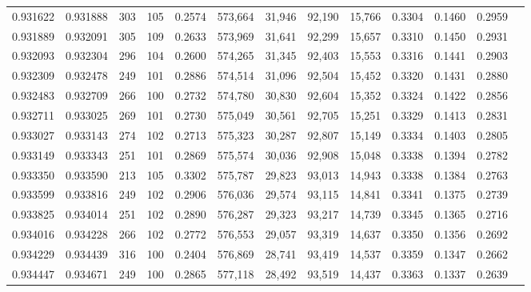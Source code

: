 \begin{tabular}{rrrrrrrrrrrrr}
0.931622 & 0.931888 &   303 & 105 &                                     0.2574 & 573,664 &  31,946 &  92,190 &  15,766 & 0.3304 & 0.1460 & 0.2959 \\
0.931889 & 0.932091 &   305 & 109 &                                     0.2633 & 573,969 &  31,641 &  92,299 &  15,657 & 0.3310 & 0.1450 & 0.2931 \\
0.932093 & 0.932304 &   296 & 104 &                                     0.2600 & 574,265 &  31,345 &  92,403 &  15,553 & 0.3316 & 0.1441 & 0.2903 \\
0.932309 & 0.932478 &   249 & 101 &                                     0.2886 & 574,514 &  31,096 &  92,504 &  15,452 & 0.3320 & 0.1431 & 0.2880 \\
0.932483 & 0.932709 &   266 & 100 &                                     0.2732 & 574,780 &  30,830 &  92,604 &  15,352 & 0.3324 & 0.1422 & 0.2856 \\
0.932711 & 0.933025 &   269 & 101 &                                     0.2730 & 575,049 &  30,561 &  92,705 &  15,251 & 0.3329 & 0.1413 & 0.2831 \\
0.933027 & 0.933143 &   274 & 102 &                                     0.2713 & 575,323 &  30,287 &  92,807 &  15,149 & 0.3334 & 0.1403 & 0.2805 \\
0.933149 & 0.933343 &   251 & 101 &                                     0.2869 & 575,574 &  30,036 &  92,908 &  15,048 & 0.3338 & 0.1394 & 0.2782 \\
0.933350 & 0.933590 &   213 & 105 &                                     0.3302 & 575,787 &  29,823 &  93,013 &  14,943 & 0.3338 & 0.1384 & 0.2763 \\
0.933599 & 0.933816 &   249 & 102 &                                     0.2906 & 576,036 &  29,574 &  93,115 &  14,841 & 0.3341 & 0.1375 & 0.2739 \\
0.933825 & 0.934014 &   251 & 102 &                                     0.2890 & 576,287 &  29,323 &  93,217 &  14,739 & 0.3345 & 0.1365 & 0.2716 \\
0.934016 & 0.934228 &   266 & 102 &                                     0.2772 & 576,553 &  29,057 &  93,319 &  14,637 & 0.3350 & 0.1356 & 0.2692 \\
0.934229 & 0.934439 &   316 & 100 &                                     0.2404 & 576,869 &  28,741 &  93,419 &  14,537 & 0.3359 & 0.1347 & 0.2662 \\
0.934447 & 0.934671 &   249 & 100 &                                     0.2865 & 577,118 &  28,492 &  93,519 &  14,437 & 0.3363 & 0.1337 & 0.2639 \\

\end{tabular}

